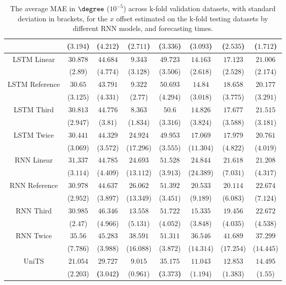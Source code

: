\begin{table}[!ht]
{\begin{tabular}{|c|c|c|c|c|c|c|c|}
			 & ($3.194$) & ($4.212$) & ($2.711$) & ($3.336$) & ($3.093$) & ($2.535$) & ($1.712$) \\ \hline
			\multirow{2}{*}{LSTM Linear} & $30.878$ & $44.684$ & $9.343$ & $49.723$ & $14.163$ & $17.123$ & $21.006$ \\
			 & ($2.89$) & ($4.774$) & ($3.128$) & ($3.506$) & ($2.618$) & ($2.528$) & ($2.174$) \\ \hline
			\multirow{2}{*}{LSTM Reference} & $30.65$ & $43.791$ & $9.322$ & $50.693$ & $14.84$ & $18.658$ & $20.177$ \\
			 & ($3.125$) & ($4.331$) & ($2.77$) & ($4.294$) & ($3.018$) & ($3.775$) & ($3.291$) \\ \hline
			\multirow{2}{*}{LSTM Third} & $30.813$ & $44.776$ & $8.363$ & $50.6$ & $14.826$ & $17.677$ & $21.515$ \\
			 & ($2.947$) & ($3.81$) & ($1.834$) & ($3.316$) & ($3.824$) & ($3.588$) & ($3.181$) \\ \hline
			\multirow{2}{*}{LSTM Twice} & $30.441$ & $44.329$ & $24.924$ & $49.953$ & $17.069$ & $17.979$ & $20.761$ \\
			 & ($3.069$) & ($3.572$) & ($17.296$) & ($3.555$) & ($11.304$) & ($4.822$) & ($4.019$) \\ \hline
			\multirow{2}{*}{RNN Linear} & $31.337$ & $44.785$ & $24.693$ & $51.528$ & $24.844$ & $21.618$ & $21.208$ \\
			 & ($3.114$) & ($4.409$) & ($13.112$) & ($3.913$) & ($24.389$) & ($7.031$) & ($4.317$) \\ \hline
			\multirow{2}{*}{RNN Reference} & $30.978$ & $44.637$ & $26.062$ & $51.392$ & $20.533$ & $20.114$ & $22.674$ \\
			 & ($2.952$) & ($3.897$) & ($13.349$) & ($3.451$) & ($9.189$) & ($6.083$) & ($7.124$) \\ \hline
			\multirow{2}{*}{RNN Third} & $30.985$ & $46.346$ & $13.558$ & $51.722$ & $15.335$ & $19.456$ & $22.672$ \\
			 & ($2.47$) & ($4.966$) & ($5.131$) & ($4.052$) & ($3.848$) & ($4.035$) & ($4.538$) \\ \hline
			\multirow{2}{*}{RNN Twice} & $35.56$ & $45.283$ & $38.591$ & $51.311$ & $36.546$ & $41.689$ & $37.299$ \\
			 & ($7.786$) & ($3.988$) & ($16.088$) & ($3.872$) & ($14.314$) & ($17.254$) & ($14.445$) \\ \hline
			\multirow{2}{*}{UniTS} & $21.054$ & $\mathbf{29.727}$ & $9.015$ & $\mathbf{35.175}$ & $11.043$ & $12.853$ & $14.495$ \\
			 & ($2.203$) & \textbf{(}$\mathbf{3.042}$\textbf{)} & ($0.961$) & \textbf{(}$\mathbf{3.373}$\textbf{)} & ($1.194$) & ($1.383$) & ($1.55$) \\ \hline
		\end{tabular}
	}
	\caption{The average MAE in $\degree$ ($10^{-5}$) across k-fold validation datasets, with standard deviation in brackets, for the $x$ offset estimated on the k-fold testing datasets by different RNN models, and forecasting times.}
	\label{tab:all_longitude_no_abs_MAE}
\end{table}

